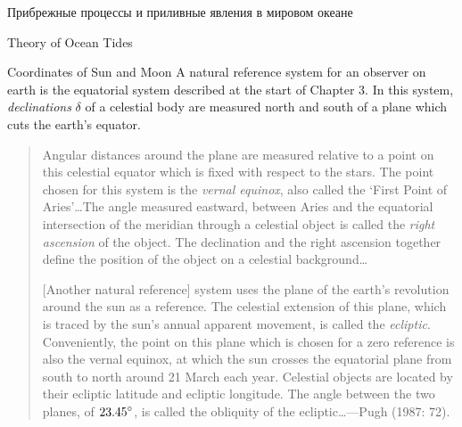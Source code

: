 \begin{chapter}{Прибрежные процессы и приливные явления в мировом океане}
\begin{section}{Theory of Ocean Tides}
\begin{paragraph}{Coordinates of Sun and Moon}
A natural reference system for an observer on earth is the equatorial
system described at the start of Chapter 3. In this system,
\textit{declinations} $\delta$ of a
celestial body are measured north and south of a plane which cuts the
earth's equator.
%
\begin{quotation}
Angular distances around the plane are measured relative to a point on
this celestial equator which is fixed with respect to the stars. The
point chosen for this system is the \textit{vernal equinox}, also
called the `First Point of Aries'\dots The angle measured eastward,
between Aries and the equatorial intersection of the meridian through
a celestial object is called the \textit{right ascension} of the
object. The declination and the right ascension together define the
position of the object on a celestial background\dots
%

[Another natural reference] system uses the plane of the earth's
revolution around the sun as a reference. The celestial extension of
this plane, which is traced by the sun's annual apparent movement, is
called the \textit{ecliptic}. Conveniently, the point on this plane
which is chosen for a zero reference is also the vernal equinox, at
which the sun crosses the equatorial plane from south to north around
21 March each year. Celestial objects are located by their ecliptic
latitude and ecliptic longitude. The angle between the two planes, of
${23.45}^\circ$, is called the obliquity of the ecliptic\dots ---Pugh
(1987: 72).
%
\end{quotation}
\end{paragraph}


\end{section}
\end{chapter}
